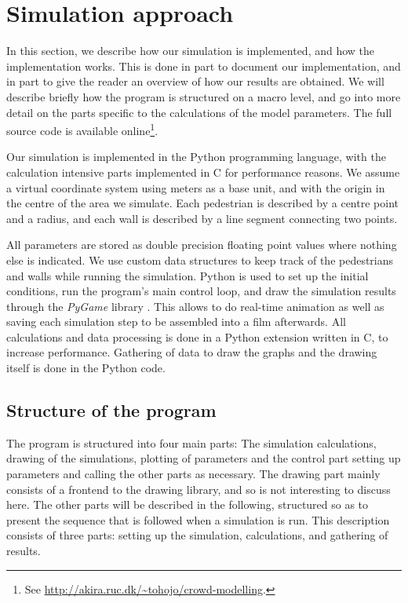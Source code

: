 \section{Simulation approach}
\label{sec:simulation}
In this section, we describe how our simulation is implemented, and how the 
implementation works. This is done in part to document our implementation, and 
in part to give the reader an overview of how our results are obtained.
We will describe briefly how the program is structured on a macro level, and 
go into more detail on the parts specific to the calculations of the model 
parameters. The full source code is available online\footnote{See 
\url{http://akira.ruc.dk/~tohojo/crowd-modelling}.}.

Our simulation is implemented in the Python programming language, with the 
calculation intensive parts implemented in C for performance reasons. We 
assume a virtual coordinate system using meters as a base unit, and with the 
origin in the centre of the area we simulate. Each pedestrian is 
described by a centre point and a radius, and each wall is described by a line 
segment connecting two points.

All parameters are stored as double precision floating point values where 
nothing else is indicated. We use custom data structures to keep track of the 
pedestrians and walls while running the simulation. Python is used to set up the 
initial conditions, run the program's main control loop, and draw the 
simulation results through the \emph{PyGame} library \cite{pygame}. This 
allows to do real-time animation as well as saving each simulation step 
to be assembled into a film afterwards. All calculations and data processing 
is done in a Python extension written in C, to increase performance. Gathering 
of data to draw the graphs and the drawing itself is done in the Python code. 

\subsection{Structure of the program}
The program is structured into four main parts: The simulation calculations, 
drawing of the simulations, plotting of parameters and the control part 
setting up parameters and calling the other parts as necessary. The drawing 
part mainly consists of a frontend to the drawing library, and so is not 
interesting to discuss here. The other parts will be described in the 
following, structured so as to present the sequence that is followed when a 
simulation is run. This description consists of three parts: setting up the 
simulation, calculations, and gathering of results.

